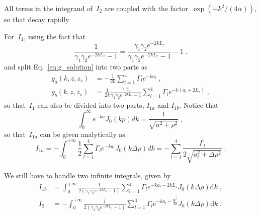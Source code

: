 \documentclass[aps,prl,reprint,showpacs,floatfix,superscriptaddress, onecolumn]{revtex4-2}
\newcommand{\V}[1]{\boldsymbol{#1}} %
\begin{document}
All terms in the integrand of~$I_2$ are coupled with the factor~$\exp{\left(- k^2 / (4 \alpha)\right)}$, so that decay rapidly

For~$I_1$, using the fact that
\begin{equation}\label{eq:beta_split}
    \frac{1}{\gamma_1 \gamma_2 e^{-2k L_z} - 1} = \frac{\gamma_1 \gamma_2 e^{-2k L_z}}{\gamma_1 \gamma_2 e^{-2k L_z} - 1} - 1\;.
\end{equation}
and split Eq.~\eqref{eq:g_solution} into two parts as
\begin{equation}
    \begin{split}
        g_a(k, z, z_s) &= - \frac{1}{2k} \sum_{l = 1}^{4} \Gamma_l e^{-k a_l}\;,\\
        g_b(k, z, z_s) &= \frac{1}{2k} \frac{\gamma_1 \gamma_2}{\gamma_1 \gamma_2 e^{-2k L_z} - 1} \sum_{l = 1}^{4} \Gamma_l e^{-k (a_l + 2 L_z)}\;,
    \end{split}
\end{equation}
so that~$I_1 $ can also be divided into two parts, $ I_{1a} $ and $ I_{1b}$.
Notice that 
\begin{equation}
    \int_0^{\infty} e^{- k a}J_0(k \rho) dk = \frac{1}{\sqrt{a^2 + \rho^2}}\;,
\end{equation}
so that~$I_{1a}$ can be given analytically as
\begin{equation}
    I_{1a} = - \int_{0}^{+\infty} \frac{1}{2} \sum_{l = 1}^{4} \Gamma_l e^{-k a_l} J_0(k \Delta \rho) d k = - \sum_{l = 1}^{4} \frac{\Gamma_l}{2 \sqrt{a_l^2 + \Delta \rho^2}}\;.
\end{equation}

We still have to handle two infinite integrals, given by
\begin{equation}
    \begin{split}
        I_{1b} &= \int_{0}^{+\infty} \frac{1}{2 (\gamma_1 \gamma_2 e^{-2k L_z} - 1)} \sum_{l = 1}^{4} \Gamma_l e^{-k a_l -2 k L_z} J_0(k \Delta \rho) \text{d} k\;,\\
        I_2 &= - \int_{0}^{+\infty} \frac{1}{2 (\gamma_1 \gamma_2 e^{-2k L_z} - 1)} \sum_{l = 1}^{4} \Gamma_l e^{-k a_l -\frac{\V{k}^2}{4 \alpha}} J_0(k \Delta \rho) \text{d} k\;.
    \end{split}
\end{equation}
\end{document}
